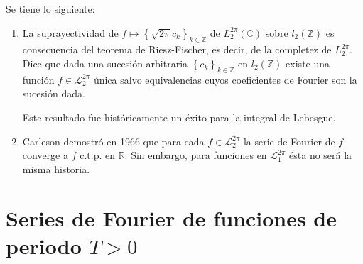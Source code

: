 \documentclass[12pt]{report}
\newcounter{it}
\theoremstyle{largebreak}
\begin{document}
    \begin{obs}
        Se tiene lo siguiente:
        \begin{enumerate}
            \item La suprayectividad de $f\mapsto\left\{\sqrt{2\pi}c_k \right\}_{ k\in\mathbb{Z}}$ de $L_2^{2\pi}(\mathbb{C})$ sobre $l_2(\mathbb{Z})$ es consecuencia del teorema de Riesz-Fischer, es decir, de la completez de $L_2^{2\pi}$. Dice que dada una sucesión arbitraria $\left\{c_k\right\}_{k\in\mathbb{Z}}$ en $l_2(\mathbb{Z})$ existe una función $f\in\mathcal{L}_2^{2\pi}$ única salvo equivalencias cuyos coeficientes de Fourier son la sucesión dada.
            
            Este resultado fue históricamente un éxito para la integral de Lebesgue.

            \item Carleson demostró en 1966 que para cada $f\in\mathcal{L}_2^{2\pi}$ la serie de Fourier de $f$ converge a $f$ c.t.p. en $\mathbb{R}$. Sin embargo, para funciones en $\mathcal{L}_1^{2\pi}$ ésta no será la misma historia.
        \end{enumerate}
    \end{obs}

    \section{Series de Fourier de funciones de periodo $T>0$}
\end{document}
